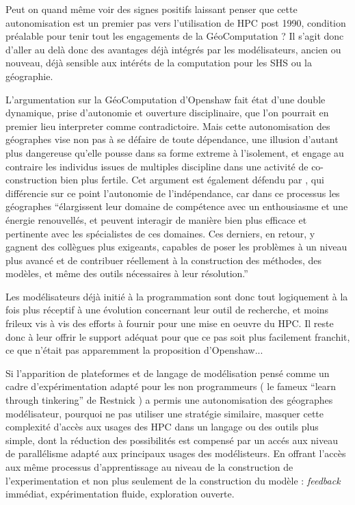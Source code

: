 Peut on quand même voir des signes positifs laissant penser que cette autonomisation est un premier pas vers l'utilisation de HPC post 1990, condition préalable pour tenir tout les engagements de la GéoComputation ? Il s'agit donc d'aller au delà donc des avantages déjà intégrés par les modélisateurs, ancien ou nouveau, déjà sensible aux intéréts de la computation pour les SHS ou la géographie.

L’argumentation sur la GéoComputation d’Openshaw fait état d’une double dynamique, prise d'autonomie et ouverture disciplinaire, que l’on pourrait en premier lieu interpreter comme contradictoire. Mais cette autonomisation des géographes vise non pas à se défaire de toute dépendance, une illusion d’autant plus dangereuse qu’elle pousse dans sa forme extreme à l’isolement, et engage au contraire les individus issues de multiples discipline dans une activité de co-construction bien plus fertile. Cet argument est également défendu par \autocite[64]{Banos2013}, qui différencie sur ce point l’autonomie de l’indépendance, car dans ce processus les géographes \enquote{élargissent leur domaine de compétence avec un enthousiasme et une énergie renouvellés, et peuvent interagir de manière bien plus efficace et pertinente avec les spécialistes de ces domaines. Ces derniers, en retour, y gagnent des collègues plus exigeants, capables de poser les problèmes à un niveau plus avancé et de contribuer réellement à la construction des méthodes, des modèles, et même des outils nécessaires à leur résolution.}

Les modélisateurs déjà initié à la programmation sont donc tout logiquement à la fois plus réceptif à une évolution concernant leur outil de recherche, et moins frileux vis à vis des efforts à fournir pour une mise en oeuvre du HPC. Il reste donc à leur offrir le support adéquat pour que ce pas soit plus facilement franchit, ce que n'était pas apparemment la proposition d'Openshaw...

Si l'apparition de plateformes et de langage de modélisation pensé comme un cadre d'expérimentation adapté pour les non programmeurs ( le fameux \foreignquote{english}{learn through tinkering} de Restnick ) a permis une autonomisation des géographes modélisateur, pourquoi ne pas utiliser une stratégie similaire, masquer cette complexité d'accès aux usages des HPC dans un langage ou des outils plus simple, dont la réduction des possibilités est compensé par un accés aux niveau de parallélisme adapté aux principaux usages des modélisteurs. En offrant l'accès aux même processus d'apprentissage au niveau de la construction de l'experimentation et non plus seulement de la construction du modèle : \textit{feedback} immédiat, expérimentation fluide, exploration ouverte.

